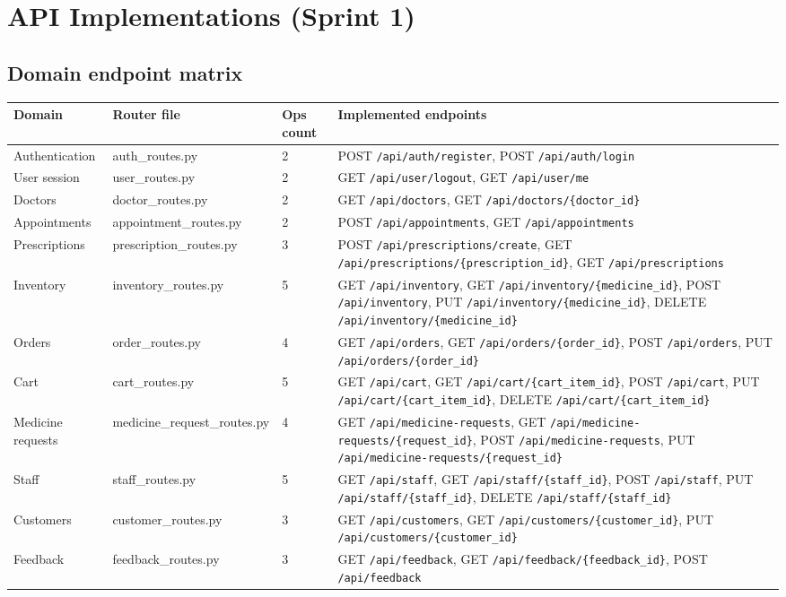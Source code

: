 \documentclass[11pt,a4paper]{article}
\newcommand{\apipath}[1]{\texttt{#1}}
\begin{document}
\section{API Implementations (Sprint 1)}
\subsection{Domain endpoint matrix}
\begin{longtable}{p{}p{}p{}p{}}
\toprule
\textbf{Domain} & \textbf{Router file} & \textbf{Ops count} & \textbf{Implemented endpoints} \\
\midrule
Authentication & auth_routes.py & 2 & POST \apipath{/api/auth/register}, POST \apipath{/api/auth/login} \\
User session & user_routes.py & 2 & GET \apipath{/api/user/logout}, GET \apipath{/api/user/me} \\
Doctors & doctor_routes.py & 2 & GET \apipath{/api/doctors}, GET \apipath{/api/doctors/\{doctor_id\}} \\
Appointments & appointment_routes.py & 2 & POST \apipath{/api/appointments}, GET \apipath{/api/appointments} \\
Prescriptions & prescription_routes.py & 3 & POST \apipath{/api/prescriptions/create}, GET \apipath{/api/prescriptions/\{prescription_id\}}, GET \apipath{/api/prescriptions} \\
Inventory & inventory_routes.py & 5 & GET \apipath{/api/inventory}, GET \apipath{/api/inventory/\{medicine_id\}}, POST \apipath{/api/inventory}, PUT \apipath{/api/inventory/\{medicine_id\}}, DELETE \apipath{/api/inventory/\{medicine_id\}} \\
Orders & order_routes.py & 4 & GET \apipath{/api/orders}, GET \apipath{/api/orders/\{order_id\}}, POST \apipath{/api/orders}, PUT \apipath{/api/orders/\{order_id\}} \\
Cart & cart_routes.py & 5 & GET \apipath{/api/cart}, GET \apipath{/api/cart/\{cart_item_id\}}, POST \apipath{/api/cart}, PUT \apipath{/api/cart/\{cart_item_id\}}, DELETE \apipath{/api/cart/\{cart_item_id\}} \\
Medicine requests & medicine_request_routes.py & 4 & GET \apipath{/api/medicine-requests}, GET \apipath{/api/medicine-requests/\{request_id\}}, POST \apipath{/api/medicine-requests}, PUT \apipath{/api/medicine-requests/\{request_id\}} \\
Staff & staff_routes.py & 5 & GET \apipath{/api/staff}, GET \apipath{/api/staff/\{staff_id\}}, POST \apipath{/api/staff}, PUT \apipath{/api/staff/\{staff_id\}}, DELETE \apipath{/api/staff/\{staff_id\}} \\
Customers & customer_routes.py & 3 & GET \apipath{/api/customers}, GET \apipath{/api/customers/\{customer_id\}}, PUT \apipath{/api/customers/\{customer_id\}} \\
Feedback & feedback_routes.py & 3 & GET \apipath{/api/feedback}, GET \apipath{/api/feedback/\{feedback_id\}}, POST \apipath{/api/feedback} \\
\bottomrule
\end{longtable}
\end{document}
